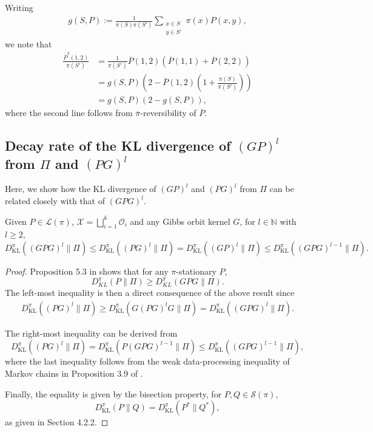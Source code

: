 \documentclass[EJP]{ejpecp} %
\begin{document}
Writing 
\begin{align} \label{eq:g(S)}
    g(S,P) := \frac{1}{\pi(S)\pi(S')} \sum_{\substack{x \in S\\ y \in S'}} \pi(x)P(x,y),
\end{align}
we note that
\begin{align*}
     \frac{\overline{P}^2(1,2)}{\pi(S')} &= \frac{1}{\pi(S')}  \overline{P}(1,2) \left(\overline{P}(1,1) + \overline{P}(2,2)\right)\\
     &= g(S,P)\left(2 - \overline{P}(1,2)\left(1+\frac{\pi(S)}{\pi(S')}\right)\right)\\
     &= g(S,P)(2 - g(S,P)),
\end{align*}
where the second line follows from $\overline{\pi}$-reversibility of $\overline{P}$.

\subsection{Decay rate of the KL divergence of $(GP)^l$ from $\Pi$ and $(PG)^l$}
Here, we show how the KL divergence of $(GP)^l$ and $(PG)^l$ from $\Pi$ can be related closely with that of $(GPG)^l$.

\begin{proposition}\label{prop:GPGPGKL}
    Given $P \in \mathcal{L}(\pi)$, $\mathcal{X} = \bigsqcup_{i=1}^k \mathcal{O}_i$ and any Gibbs orbit kernel $G$, for $l \in \mathbb{N}$ with $l \geq 2$, 
    $$D_{\mathrm{KL}}^\pi \left((GPG)^l \| \Pi \right) \leq D_{\mathrm{KL}}^\pi \left((PG)^l \| \Pi \right) = D_{\mathrm{KL}}^\pi \left((GP)^l \| \Pi \right) \leq D_{\mathrm{KL}}^\pi \left((GPG)^{l-1} \| \Pi \right).$$
\end{proposition}

\begin{proof}
    Proposition 5.3 in \cite{GPG} shows that for any $\pi$-stationary $P$,
    $$D_{KL}^\pi(P \| \Pi) \geq D_{KL}^\pi(GPG \| \Pi).$$
    The left-most inequality is then a direct consequence of the above result since
    \begin{align*}
        D_{\mathrm{KL}}^\pi \left((PG)^l \| \Pi \right) \geq D_{\mathrm{KL}}^\pi \left(G(PG)^lG \| \Pi \right) = D_{\mathrm{KL}}^\pi \left((GPG)^l \| \Pi \right).
    \end{align*}

    The right-most inequality can be derived from 
    $$D_{\mathrm{KL}}^\pi \left((PG)^l \| \Pi \right) = D_{\mathrm{KL}}^\pi \left(P(GPG)^{l-1} \| \Pi \right) \leq D_{\mathrm{KL}}^\pi \left((GPG)^{l-1} \| \Pi \right),$$
    where the last inequality follows from the weak data-processing inequality of Markov chains in Proposition 3.9 of \cite{wang2023informationdivergencesmarkovchains}.
    
    Finally, the equality is given by the bisection property, for $P,Q \in \mathcal{S}(\pi)$,
    $$D_{\mathrm{KL}}^\pi(P \| Q) = D_{\mathrm{KL}}^\pi(P^* \| Q^*),$$
    as given in \cite{wolfer_2023} Section 4.2.2.
\end{proof}
\end{document}
